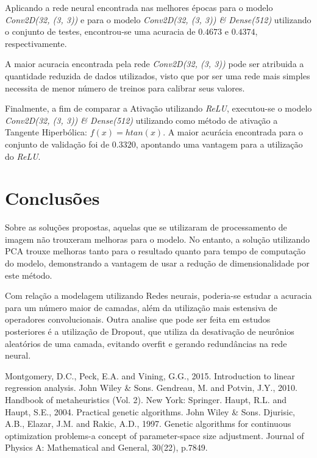 \documentclass[conference]{IEEEtran}
\begin{document}
Aplicando a rede neural encontrada nas melhores épocas para o modelo \textit{Conv2D(32, (3, 3))} e para o modelo \textit{Conv2D(32, (3, 3)) \& Dense(512)} utilizando o conjunto de testes, encontrou-se uma acuracia de $0.4673$ e $0.4374$, respectivamente. 

A maior acuracia encontrada pela rede \textit{Conv2D(32, (3, 3))} pode ser atribuida a quantidade reduzida de dados utilizados, visto que por ser uma rede mais simples necessita de menor número de treinos para calibrar seus valores. 

Finalmente, a fim de comparar a Ativação utilizando \textit{ReLU}, executou-se o modelo \textit{Conv2D(32, (3, 3)) \& Dense(512)} utilizando como método de ativação a Tangente Hiperbólica: $f(x) = htan(x)$. A maior acurácia encontrada para o conjunto de validação foi de $0.3320$, apontando uma vantagem para a utilização do \textit{ReLU}. 

\section{Conclusões}
Sobre as soluções propostas, aquelas que se utilizaram de processamento de imagem não trouxeram melhoras para o modelo. No entanto, a solução utilizando PCA trouxe melhoras tanto para o resultado quanto para tempo de computação do modelo, demonstrando a vantagem de usar a redução de dimensionalidade por este método.

Com relação a modelagem utilizando Redes neurais, poderia-se estudar a acuracia para um número maior de camadas, além da utilização mais estensiva de operadores convolucionais. Outra analise que pode ser feita em estudos posteriores é a utilização de Dropout, que utiliza da desativação de neurônios aleatórios de uma camada, evitando overfit e gerando redundâncias na rede neural. 

\begin{thebibliography}{00}
 Montgomery, D.C., Peck, E.A. and Vining, G.G., 2015. Introduction to linear regression analysis. John Wiley \& Sons.
 Gendreau, M. and Potvin, J.Y., 2010. Handbook of metaheuristics (Vol. 2). New York: Springer.
 Haupt, R.L. and Haupt, S.E., 2004. Practical genetic algorithms. John Wiley \& Sons.
 Djurisic, A.B., Elazar, J.M. and Rakic, A.D., 1997. Genetic algorithms for continuous optimization problems-a concept of parameter-space size adjustment. Journal of Physics A: Mathematical and General, 30(22), p.7849.
\end{thebibliography}
\end{document}
